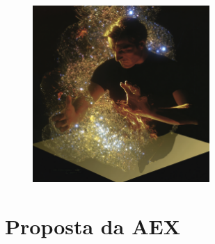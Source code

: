 \documentclass[a4paper,12pt, brazil]{article}
\begin{document}
    
    
    \begin{figure}[h]
        \centering
        \includegraphics[width=0.6\textwidth]{imagem-de-capa.png}
    \end{figure}
    
    \newpage
    
    \section*{Proposta da AEX}
    
\end{document}
